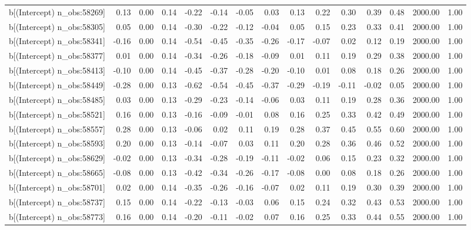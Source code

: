 \begin{table}[ht]
\begin{tabular}{rrrrrrrrrrrrrrr}
  b[(Intercept) n\_obs:58269] & 0.13 & 0.00 & 0.14 & -0.22 & -0.14 & -0.05 & 0.03 & 0.13 & 0.22 & 0.30 & 0.39 & 0.48 & 2000.00 & 1.00 \\ 
  b[(Intercept) n\_obs:58305] & 0.05 & 0.00 & 0.14 & -0.30 & -0.22 & -0.12 & -0.04 & 0.05 & 0.15 & 0.23 & 0.33 & 0.41 & 2000.00 & 1.00 \\ 
  b[(Intercept) n\_obs:58341] & -0.16 & 0.00 & 0.14 & -0.54 & -0.45 & -0.35 & -0.26 & -0.17 & -0.07 & 0.02 & 0.12 & 0.19 & 2000.00 & 1.00 \\ 
  b[(Intercept) n\_obs:58377] & 0.01 & 0.00 & 0.14 & -0.34 & -0.26 & -0.18 & -0.09 & 0.01 & 0.11 & 0.19 & 0.29 & 0.38 & 2000.00 & 1.00 \\ 
  b[(Intercept) n\_obs:58413] & -0.10 & 0.00 & 0.14 & -0.45 & -0.37 & -0.28 & -0.20 & -0.10 & 0.01 & 0.08 & 0.18 & 0.26 & 2000.00 & 1.00 \\ 
  b[(Intercept) n\_obs:58449] & -0.28 & 0.00 & 0.13 & -0.62 & -0.54 & -0.45 & -0.37 & -0.29 & -0.19 & -0.11 & -0.02 & 0.05 & 2000.00 & 1.00 \\ 
  b[(Intercept) n\_obs:58485] & 0.03 & 0.00 & 0.13 & -0.29 & -0.23 & -0.14 & -0.06 & 0.03 & 0.11 & 0.19 & 0.28 & 0.36 & 2000.00 & 1.00 \\ 
  b[(Intercept) n\_obs:58521] & 0.16 & 0.00 & 0.13 & -0.16 & -0.09 & -0.01 & 0.08 & 0.16 & 0.25 & 0.33 & 0.42 & 0.49 & 2000.00 & 1.00 \\ 
  b[(Intercept) n\_obs:58557] & 0.28 & 0.00 & 0.13 & -0.06 & 0.02 & 0.11 & 0.19 & 0.28 & 0.37 & 0.45 & 0.55 & 0.60 & 2000.00 & 1.00 \\ 
  b[(Intercept) n\_obs:58593] & 0.20 & 0.00 & 0.13 & -0.14 & -0.07 & 0.03 & 0.11 & 0.20 & 0.28 & 0.36 & 0.46 & 0.52 & 2000.00 & 1.00 \\ 
  b[(Intercept) n\_obs:58629] & -0.02 & 0.00 & 0.13 & -0.34 & -0.28 & -0.19 & -0.11 & -0.02 & 0.06 & 0.15 & 0.23 & 0.32 & 2000.00 & 1.00 \\ 
  b[(Intercept) n\_obs:58665] & -0.08 & 0.00 & 0.13 & -0.42 & -0.34 & -0.26 & -0.17 & -0.08 & 0.00 & 0.08 & 0.18 & 0.26 & 2000.00 & 1.00 \\ 
  b[(Intercept) n\_obs:58701] & 0.02 & 0.00 & 0.14 & -0.35 & -0.26 & -0.16 & -0.07 & 0.02 & 0.11 & 0.19 & 0.30 & 0.39 & 2000.00 & 1.00 \\ 
  b[(Intercept) n\_obs:58737] & 0.15 & 0.00 & 0.14 & -0.22 & -0.13 & -0.03 & 0.06 & 0.15 & 0.24 & 0.32 & 0.43 & 0.53 & 2000.00 & 1.00 \\ 
  b[(Intercept) n\_obs:58773] & 0.16 & 0.00 & 0.14 & -0.20 & -0.11 & -0.02 & 0.07 & 0.16 & 0.25 & 0.33 & 0.44 & 0.55 & 2000.00 & 1.00 \\ 

\end{tabular}
\end{table}
